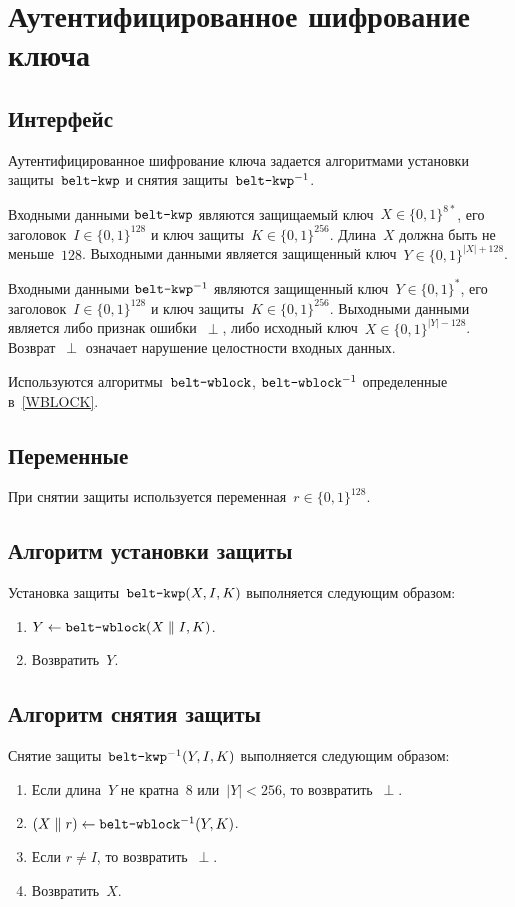 \section{Аутентифицированное шифрование ключа}\label{KWP}

\subsection{Интерфейс}\label{KWP.IFace}

Аутентифицированное шифрование ключа задается алгоритмами установки 
защиты~$\texttt{belt-kwp}$ и снятия защиты~$\texttt{belt-kwp}^{-1}$.

Входными данными $\texttt{belt-kwp}$ являются защищаемый 
ключ~$X\in\{0,1\}^{8*}$, его заголовок~$I\in\{0,1\}^{128}$ и ключ 
защиты~$K\in\{0,1\}^{256}$. Длина~$X$ должна быть не меньше~$128$.
%
Выходными данными является защищенный ключ~$Y\in\{0,1\}^{|X|+128}$.

Входными данными $\texttt{belt-kwp}^{-1}$ являются защищенный
ключ~$Y\in\{0,1\}^*$, его заголовок~$I\in\{0,1\}^{128}$ и ключ
защиты~$K\in\{0,1\}^{256}$.
%
Выходными данными является либо признак ошибки~$\perp$,
либо исходный ключ~$X\in\{0,1\}^{|Y|-128}$.
%
Возврат~$\perp$ означает нарушение целостности входных данных.

Используются алгоритмы~$\texttt{belt-wblock}$, $\texttt{belt-wblock}^{-1}$
определенные в~\ref{WBLOCK}.

\subsection{Переменные}\label{KWP.Vars}

При снятии защиты используется переменная~$r\in\{0,1\}^{128}$.

\subsection{Алгоритм установки защиты}\label{KWP.Wrap}

Установка защиты~$\texttt{belt-kwp}(X,I,K)$ выполняется следующим образом:
\begin{enumerate}
\item
$Y\leftarrow\texttt{belt-wblock}(X\parallel I,K)$.

\item
Возвратить~$Y$.
\end{enumerate}

\subsection{Алгоритм снятия защиты}\label{KWP.Unwrap}

Снятие защиты~$\texttt{belt-kwp}^{-1}(Y,I,K)$ выполняется следующим образом:
\begin{enumerate}
\item
Если длина~$Y$ не кратна~$8$ или~$|Y|<256$, то возвратить~$\perp$.
\item
$(X\parallel r)\leftarrow \texttt{belt-wblock}^{-1}(Y,K)$.
\item
Если $r\neq I$, то возвратить~$\perp$.
\item
Возвратить~$X$.
\end{enumerate}
